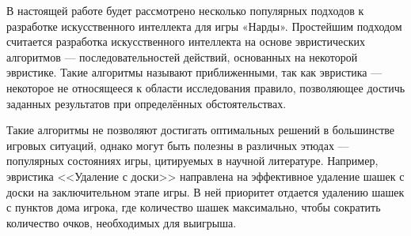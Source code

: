 В настоящей работе будет рассмотрено несколько популярных подходов к разработке искусственного интеллекта для игры «Нарды». Простейшим подходом считается разработка искусственного интеллекта на основе эвристических алгоритмов --- последовательностей действий, основанных на некоторой эвристике. Такие алгоритмы называют приближенными, так как эвристика --- некоторое не относящееся к области исследования правило, позволяющее достичь заданных результатов при определённых обстоятельствах.

Такие алгоритмы не позволяют достигать оптимальных решений в большинстве игровых ситуаций, однако могут быть полезны в различных этюдах --- популярных состояниях игры, цитируемых в научной литературе. Например, эвристика <<Удаление с доски>> направлена на эффективное удаление шашек с доски на заключительном этапе игры. В ней приоритет отдается удалению шашек с пунктов дома игрока, где количество шашек максимально, чтобы сократить количество очков, необходимых для выигрыша.
